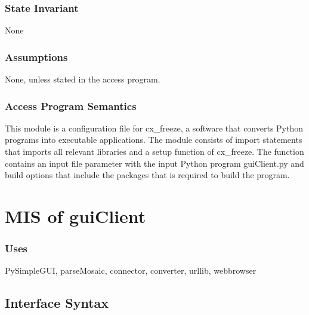 \documentclass[12pt, titlepage]{article}
\begin{document}
\subsubsection{State Invariant}
None
\subsubsection{Assumptions}
None, unless stated in the access program.
\subsubsection{Access Program Semantics}
This module is a configuration file for cx\_freeze, a software that converts Python programs into executable applications. The module consists of import statements that imports all relevant libraries and a setup function of cx\_freeze. The function contains an input file parameter with the input Python program guiClient.py and build options that include the packages that is required to build the program.
\color{black}

\newpage
\section{MIS of guiClient} \label{SecM5}
\subsubsection{Uses}
PySimpleGUI, parseMosaic, connector, converter, urllib, webbrowser


\subsection{Interface Syntax}
\end{document}
